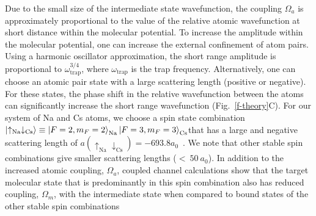\documentclass[aps,prl,twocolumn,superscriptaddress]{revtex4-1}
\begin{document}
Due to the small size of the intermediate state wavefunction, the coupling $\Omega_a$ is approximately proportional to the value of the relative atomic wavefunction at short distance within the molecular potential. To increase the amplitude within the molecular potential, one can increase the external confinement of atom pairs. Using a harmonic oscillator approximation, the short range amplitude is proportional to $ \omega_{\text{trap}}^{3/4} $, where $ \omega_{\text{trap}} $ is the trap frequency. Alternatively, one can choose an atomic pair state with a large scattering length (positive or negative).
For these states, the phase shift in the relative wavefunction between the atoms can significantly increase the short range wavefunction (Fig.~\ref{f-theory}C). %
For our system of Na and Cs atoms, we choose  a spin state combination $\ket{\uparrow_{\text{Na}} \downarrow_{\text{Cs}}}\equiv \ket{F=2,m_F=2}_{\text{Na}}\ket{F=3,m_F=3}_{\text{Cs}} $that has a large and negative scattering length of $ a(\uparrow_{\text{Na}} \downarrow_{\text{Cs}}) = -693.8a_0$~\cite{Hood2019}. We note that other stable spin combinations give smaller scattering lengths ($<~50~a_0$).
In addition to the increased atomic coupling, $ \Omega_a $, %
coupled channel calculations show that the target molecular state that is predominantly in this spin combination also has reduced coupling, $ \Omega_m $, with the intermediate state when compared to bound states of the other stable spin combinations %
\end{document}

